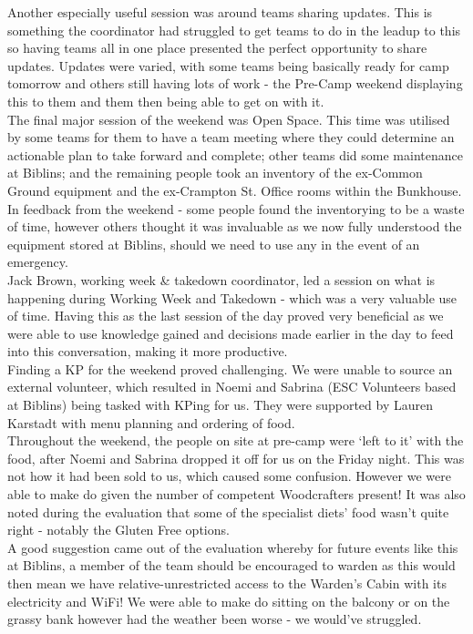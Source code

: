 Another especially useful session was around teams sharing updates. This is something the coordinator had struggled to get teams to do in the leadup to this so having teams all in one place presented the perfect opportunity to share updates. Updates were varied, with some teams being basically ready for camp tomorrow and others still having lots of work - the Pre-Camp weekend displaying this to them and them then being able to get on with it.\\

The final major session of the weekend was Open Space. This time was utilised by some teams for them to have a team meeting where they could determine an actionable plan to take forward and complete; other teams did some maintenance at Biblins; and the remaining people took an inventory of the ex-Common Ground equipment and the ex-Crampton St. Office rooms within the Bunkhouse. In feedback from the weekend - some people found the inventorying to be a waste of time, however others thought it was invaluable as we now fully understood the equipment stored at Biblins, should we need to use any in the event of an emergency.\\

Jack Brown, working week \& takedown coordinator, led a session on what is happening during Working Week and Takedown - which was a very valuable use of time. Having this as the last session of the day proved very beneficial as we were able to use knowledge gained and decisions made earlier in the day to feed into this conversation, making it more productive.\\

Finding a KP for the weekend proved challenging. We were unable to source an external volunteer, which resulted in Noemi and Sabrina (ESC Volunteers based at Biblins) being tasked with KPing for us. They were supported by Lauren Karstadt with menu planning and ordering of food.\\

Throughout the weekend, the people on site at pre-camp were `left to it' with the food, after Noemi and Sabrina dropped it off for us on the Friday night. This was not how it had been sold to us, which caused some confusion. However we were able to make do given the number of competent Woodcrafters present! It was also noted during the evaluation that some of the specialist diets' food wasn't quite right - notably the Gluten Free options. \\

A good suggestion came out of the evaluation whereby for future events like this at Biblins, a member of the team should be encouraged to warden as this would then mean we have relative-unrestricted access to the Warden's Cabin with its electricity and WiFi! We were able to make do sitting on the balcony or on the grassy bank however had the weather been worse - we would've struggled. \\

